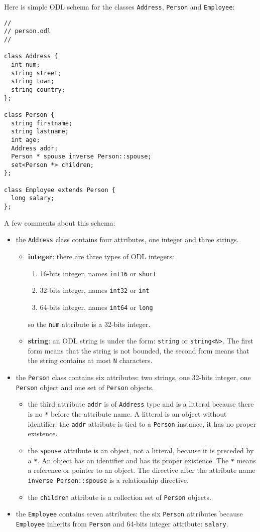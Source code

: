 Here is simple ODL schema for the classes \texttt{Address}, \texttt{Person} 
and \texttt{Employee}:
\verbsize \begin{verbatim}
//
// person.odl
//

class Address {
  int num;
  string street;
  string town;
  string country;
};

class Person {
  string firstname;
  string lastname;
  int age;
  Address addr;
  Person * spouse inverse Person::spouse;
  set<Person *> children;
};

class Employee extends Person {
  long salary;
};
\end{verbatim}
\normalsize
A few comments about this schema:
\begin{itemize}
\item the \texttt{Address} class contains four attributes, one integer
and three strings.
\begin{itemize}
\item {\bf integer}: there are three types of ODL integers: 
\begin{enumerate}
\item 16-bits integer, names \texttt{int16} or \texttt{short} 
\item 32-bits integer, names \texttt{int32} or \texttt{int} 
\item 64-bits integer, names \texttt{int64} or \texttt{long} 
\end{enumerate}
so the \texttt{num} attribute is a 32-bits integer.
\item {\bf string}: an ODL string is under the form: \texttt{string} or
\texttt{string<N>}. The
first form means that the string is not bounded, the second form means
that the string contains at most \texttt{N} characters.
\end{itemize}
\item the \texttt{Person} class contains six attributes: two strings, one
32-bits integer, one \texttt{Person} object and one set of \texttt{Person}
objects.
\begin{itemize}
\item the third attribute \texttt{addr} is of \texttt{Address} type and is
a litteral because there is no \texttt{*} before the attribute name.
A litteral is an object without identifier: the \texttt{addr} attribute
is tied to a \texttt{Person} instance, it has no proper existence.
\item the \texttt{spouse} attribute is an object, not a litteral, because
it is preceded by a \texttt{*}. An object has an identifier and has its
proper existence. The \texttt{*} means a reference or pointer to an
object.
The directive after the attribute name \texttt{inverse Person::spouse}
is a relationship directive.
\item the \texttt{children} attribute is a collection set of
\texttt{Person} objects.
\end{itemize}
\item the \texttt{Employee} contains seven attributes: the six \texttt{Person}
attributes because \texttt{Employee} inherits from \texttt{Person} and 
64-bits integer attribute: \texttt{salary}.
\end{itemize}

